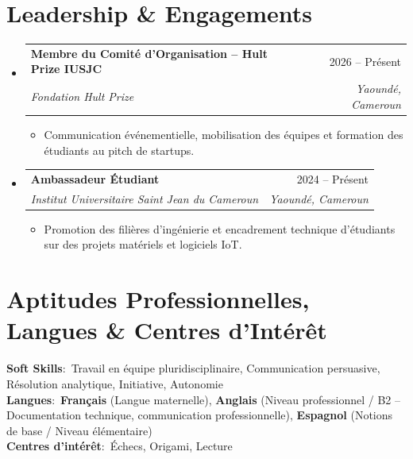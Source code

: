 \documentclass[letterpaper,10pt]{article}
\makeatletter
\newcommand{\resumeItem}[1]{
  \item\small{
    {#1 \vspace{-1.5pt}}
  }
}
\newcommand{\resumeSubheading}[4]{
  \vspace{-1pt}\item
    \begin{tabular*}{0.98\textwidth}[t]{l@{\extracolsep{\fill}}r}
      \textbf{#1} & #2 \\
      \textit{\small#3} & \textit{\small #4} \\
    \end{tabular*}\vspace{-5pt}
}
\newcommand{\resumeSubHeadingListStart}{\begin{itemize}[leftmargin=0.15in, label={}]}
\newcommand{\resumeSubHeadingListEnd}{\end{itemize}}
\newcommand{\resumeItemListStart}{\begin{itemize}[leftmargin=0.2in, label={$\vcenter{\hbox{\tiny$\bullet$}}$}, itemsep=1.2pt, parsep=0pt]}
\newcommand{\resumeItemListEnd}{\end{itemize}\vspace{-3pt}}
\makeatother
\begin{document}
\section{Leadership \& Engagements}
  \resumeSubHeadingListStart
    \resumeSubheading
      {Membre du Comité d'Organisation -- Hult Prize IUSJC}{2026 -- Présent}
      {Fondation Hult Prize}{Yaoundé, Cameroun}
      \resumeItemListStart
        \resumeItem{Communication événementielle, mobilisation des équipes et formation des étudiants au pitch de startups.}
      \resumeItemListEnd
    \resumeSubheading
      {Ambassadeur Étudiant}{2024 -- Présent}
      {Institut Universitaire Saint Jean du Cameroun}{Yaoundé, Cameroun}
      \resumeItemListStart
        \resumeItem{Promotion des filières d'ingénierie et encadrement technique d'étudiants sur des projets matériels et logiciels IoT.}
      \resumeItemListEnd
  \resumeSubHeadingListEnd

\section{Aptitudes Professionnelles, Langues \& Centres d'Intérêt}
\begin{itemize}[leftmargin=0.15in, label={}]
    \small{\item{
     \textbf{Soft Skills}{:\ Travail en équipe pluridisciplinaire, Communication persuasive, Résolution analytique, Initiative, Autonomie} \\ \vspace{1.5pt}
     \textbf{Langues}{:\ \textbf{Français} (Langue maternelle), \textbf{Anglais} (Niveau professionnel / B2 -- Documentation technique, communication professionnelle), \textbf{Espagnol} (Notions de base / Niveau élémentaire)} \\ \vspace{1.5pt}
     \textbf{Centres d'intérêt}{:\ Échecs, Origami, Lecture}
    }}
\end{itemize}

\end{document}
